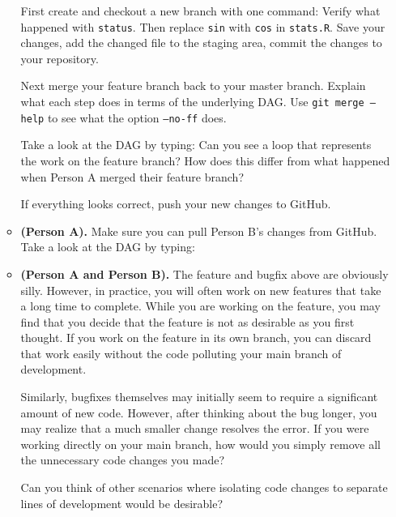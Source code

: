 \documentclass{article}
\begin{document}
\begin{enumerate}
\begin{itemize}
First create and checkout a new branch with one command:
Verify what happened with \texttt{status}.  Then replace \texttt{sin} with
\texttt{cos} in \texttt{stats.R}.  Save your changes, add the changed file
to the staging area, commit the changes to your repository.

Next merge your feature branch back to your master branch.
Explain what each step does in terms of the underlying DAG.
Use \texttt{git merge --help} to see what the option \texttt{--no-ff}
does.  

Take a look at the DAG by typing:
Can you see a loop that represents the work on the feature branch?
How does this differ from what happened when Person A merged their
feature branch?

If everything looks correct, push your new changes to GitHub.

\item \textbf{(Person A).} Make sure you can pull Person B's changes
from GitHub.  Take a look at the DAG by typing:

\item \textbf{(Person A and Person B).} The feature and bugfix above
are obviously silly.  However, in practice, you will often work on
new features that take a long time to complete.  While you are working
on the feature, you may find that you decide that the feature is not
as desirable as you first thought.  If you work on the feature in
its own branch, you can discard that work easily without the code
polluting your main branch of development.

Similarly, bugfixes themselves may initially seem to require a significant
amount of new code.  However, after thinking about the bug longer, you may
realize that a much smaller change resolves the error.  If you were
working directly on your main branch, how would you simply remove all the
unnecessary code changes you made?

Can you think of other scenarios where isolating code changes to separate
lines of development would be desirable?

\end{itemize}



\end{enumerate}
\end{document}
